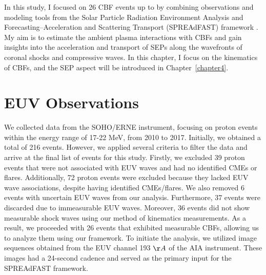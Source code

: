 In this study, I focused on 26 CBF events up to \rsun by combining observations and modeling tools from the Solar Particle Radiation Environment Analysis and Forecasting--Acceleration and Scattering Transport (SPREAdFAST) framework \citep{kozarev_2022}. My aim is to estimate the ambient plasma interactions with CBFs and gain insights into the acceleration and transport of SEPs along the wavefronts of coronal shocks and compressive waves.
In this chapter, I focus on the kinematics of CBFs, and the SEP aspect will be introduced in Chapter~\ref{chapter4}.

\section{EUV Observations}
We collected data from the SOHO/ERNE instrument, focusing on proton events within the energy range of 17-22 MeV, from 2010 to 2017. Initially, we obtained a total of 216 events. However, we applied several criteria to filter the data and arrive at the final list of events for this study.
Firstly, we excluded 39 proton events that were not associated with EUV waves and had no identified CMEs or flares. Additionally, 72 proton events were excluded because they lacked EUV wave associations, despite having identified CMEs/flares. We also removed 6 events with uncertain EUV waves from our analysis. Furthermore, 37 events were discarded due to immeasurable EUV waves.
Moreover, 36 events did not show measurable shock waves using our method of kinematics measurements. As a result, we proceeded with 26 events that exhibited measurable CBFs, allowing us to analyze them using our framework.
To initiate the analysis, we utilized image sequences obtained from the EUV channel 193 $\AA$ of the AIA instrument. These images had a 24-second cadence and served as the primary input for the SPREAdFAST framework.

